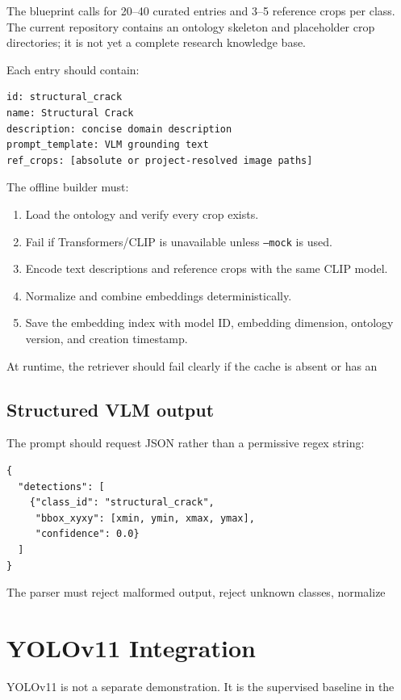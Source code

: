 \documentclass[11pt,a4paper]{article}
\newcommand{\code}[1]{\texttt{\small #1}}
\begin{document}
The blueprint calls for 20--40 curated entries and 3--5 reference crops per
class. The current repository contains an ontology skeleton and placeholder
crop directories; it is not yet a complete research knowledge base.

Each entry should contain:

\begin{verbatim}
id: structural_crack
name: Structural Crack
description: concise domain description
prompt_template: VLM grounding text
ref_crops: [absolute or project-resolved image paths]
\end{verbatim}

The offline builder must:

\begin{enumerate}[leftmargin=1.2cm]
\item Load the ontology and verify every crop exists.
\item Fail if Transformers/CLIP is unavailable unless \code{--mock} is used.
\item Encode text descriptions and reference crops with the same CLIP model.
\item Normalize and combine embeddings deterministically.
\item Save the embedding index with model ID, embedding dimension, ontology
version, and creation timestamp.
\end{enumerate}

At runtime, the retriever should fail clearly if the cache is absent or has an

\subsection{Structured VLM output}

The prompt should request JSON rather than a permissive regex string:

\begin{verbatim}
{
  "detections": [
    {"class_id": "structural_crack",
     "bbox_xyxy": [xmin, ymin, xmax, ymax],
     "confidence": 0.0}
  ]
}
\end{verbatim}

The parser must reject malformed output, reject unknown classes, normalize

\section{YOLOv11 Integration}

YOLOv11 is not a separate demonstration. It is the supervised baseline in the
\end{document}
